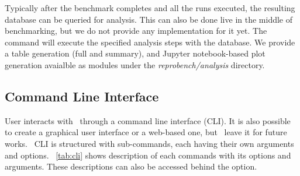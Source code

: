 Typically after the benchmark completes and all the runs executed, the resulting database can be queried for analysis.
This can also be done live in the middle of benchmarking, but we do not provide any implementation for it yet.
The  command will execute the specified analysis steps with the database.
We provide a table generation (full and summary), and Jupyter notebook-based plot generation avaialble as modules under the \emph{reprobench/analysis} directory.


\subsection{Command Line Interface}

User interacts with \OurBenchmarkingTool~through a command line interface (CLI).
It is also possible to create a graphical user interface or a web-based one, but \first~leave it for future works.
\OurBenchmarkingTool~CLI is structured with sub-commands, each having their own arguments and options.
\tab~\ref{tab:cli} shows description of each commands with its options and arguments.
These descriptions can also be accessed behind the  option.

